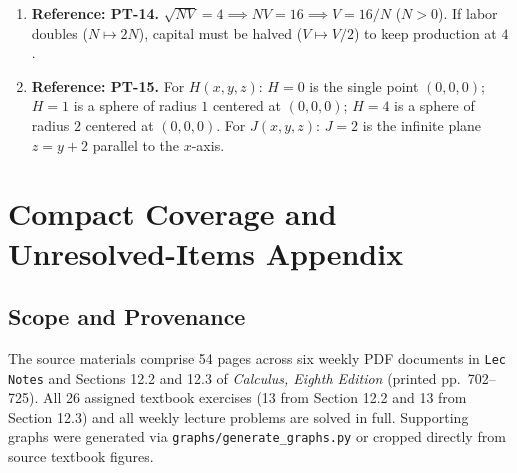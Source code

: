 \documentclass[11pt,letterpaper]{article}
\begin{document}
\begin{enumerate}[label=\textbf{A\arabic*.},leftmargin=*]
    \item \textbf{Reference: PT-14.} $\sqrt{NV} = 4 \implies NV = 16 \implies V = 16/N$ ($N>0$). If labor doubles ($N \mapsto 2N$), capital must be halved ($V \mapsto V/2$) to keep production at $4$.
    
    \item \textbf{Reference: PT-15.} For $H(x,y,z)$: $H=0$ is the single point $(0,0,0)$; $H=1$ is a sphere of radius $1$ centered at $(0,0,0)$; $H=4$ is a sphere of radius $2$ centered at $(0,0,0)$. For $J(x,y,z)$: $J=2$ is the infinite plane $z = y + 2$ parallel to the $x$-axis.
\end{enumerate}

\clearpage

\section{Compact Coverage and Unresolved-Items Appendix}\label{sec:coverage-audit}

\subsection{Scope and Provenance}
The source materials comprise 54 pages across six weekly PDF documents in \texttt{Lec Notes} and Sections 12.2 and 12.3 of \emph{Calculus, Eighth Edition} (printed pp.~702--725). All 26 assigned textbook exercises (13 from Section 12.2 and 13 from Section 12.3) and all weekly lecture problems are solved in full. Supporting graphs were generated via \texttt{graphs/generate\_graphs.py} or cropped directly from source textbook figures.
\end{document}
